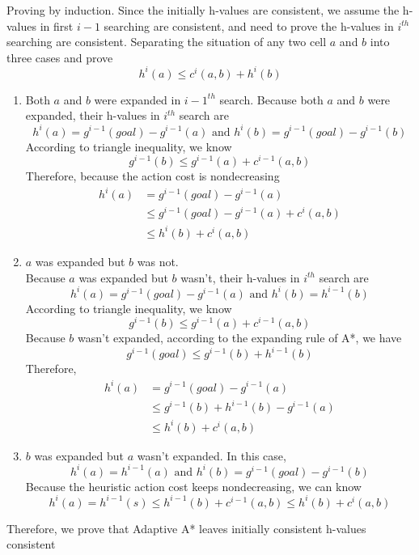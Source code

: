 \documentclass[11pt]{article}
\begin{document}
Proving by induction.
\newline
Since the initially h-values are consistent, we assume the h-values in first $i-1$ searching are consistent, and need to prove the h-values in $i^{th}$ searching are consistent. Separating the situation of any two cell $a$ and $b$ into three cases and prove
	$$h^i(a)\leq c^i(a, b) + h^i(b)$$
\begin{enumerate}
	\item Both $a$ and $b$ were expanded in ${i-1}^{th}$ search.
\newline Because both $a$ and $b$ were expanded, their h-values in $i^{th}$ search are
$$h^i(a)=g^{i-1}(goal)-g^{i-1}(a) 
\text{ and }
h^i(b)=g^{i-1}(goal)-g^{i-1}(b)$$
According to triangle inequality, we know
$$g^{i-1}(b)\leq g^{i-1}(a)+c^{i-1}(a,b)$$
Therefore, because the action cost is nondecreasing
\begin{equation}\nonumber
\begin{aligned}
h^i(a)&=g^{i-1}(goal)-g^{i-1}(a)\\ &\leq g^{i-1}(goal)-g^{i-1}(a)+c^{i}(a,b)\\&\leq h^{i}(b)+c^i(a,b)
\end{aligned}
\end{equation}

\item $a$ was expanded but $b$ was not.\\
Because $a$ was expanded but $b$ wasn't, their h-values in $i^{th}$ search are
$$h^i(a)=g^{i-1}(goal)-g^{i-1}(a) 
\text{ and }
h^i(b)=h^{i-1}(b)$$
According to triangle inequality, we know
$$g^{i-1}(b)\leq g^{i-1}(a)+c^{i-1}(a,b)$$
Because $b$ wasn't expanded, according to the expanding rule of A*, we have
$$g^{i-1}(goal)\leq g^{i-1}(b) + h^{i-1}(b)$$
Therefore,
\begin{equation}\nonumber
\begin{aligned}
h^i(a)&=g^{i-1}(goal)-g^{i-1}(a)\\ &\leq g^{i-1}(b) + h^{i-1}(b) - g^{i-1}(a)\\&\leq h^{i}(b)+c^i(a,b)
\end{aligned}
\end{equation}

\item $b$ was expanded but $a$ wasn't expanded.
\newline In this case, 
$$h^i(a)=h^{i-1}(a) 
\text{ and }
h^i(b)=g^{i-1}(goal)-g^{i-1}(b)$$
Because the heuristic action cost keeps nondecreasing, we can know 
$$h^i(a)=h^{i-1}(s)\leq h^{i-1}(b)+c^{i-1}(a,b)\leq h^{i}(b)+c^{i}(a,b)$$ 
\end{enumerate}
Therefore, we prove that Adaptive A* leaves initially consistent h-values consistent 
\end{document}
